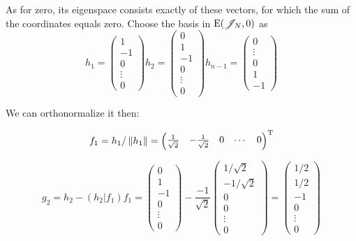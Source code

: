 \documentclass{article}
\begin{document}
As for zero, its eigenspace consists exactly of these vectors,
for which the sum of the coordinates equals zero.
Choose the basis in \( \mathrm{E}({\mathscr{J}_{N}}, {0}) \) as
\[
h_1 = \begin{pmatrix}1 \\ -1 \\ 0 \\ \vdots \\ 0\end{pmatrix}
    h_2 = \begin{pmatrix}0 \\ 1 \\ -1 \\ 0 \\ \vdots \\ 0\end{pmatrix}
        h_{n-1} = \begin{pmatrix}0 \\ \vdots \\ 0 \\ 1 \\ -1 \end{pmatrix}\]

            We can orthonormalize it then:

\[f_1 = h_1 / \left\|{h_1}\right\| =
\begin{pmatrix}\frac{1}{\sqrt2} & - \frac{1}{\sqrt2} & 0 & \cdots & 0 \end{pmatrix}^{\mathrm{T}}\]

    \[g_2 = h_2 - \left(h_2|f_1\right)f_1 =
\begin{pmatrix}0\\ 1\\ -1 \\ 0 \\ \vdots \\ 0 \end{pmatrix}
    -
\frac{-1}{\sqrt2} \begin{pmatrix} 1/\sqrt2 \\ - 1/\sqrt2 \\ 0 \\ 0 \\ \vdots \\ 0 \end{pmatrix}
    = \begin{pmatrix} 1/2 \\ 1/2 \\ -1 \\ 0 \\ \vdots \\ 0 \end{pmatrix}\]
\end{document}
